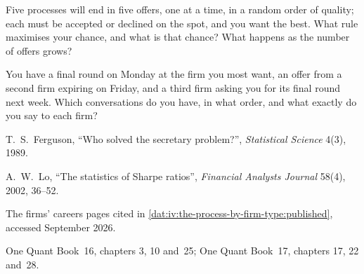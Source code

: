 \begin{interviewq}\label{iq:iv:the-process-by-firm-type:7}
Five processes will end in five offers, one at a time, in a random order of quality; each must be accepted or
declined on the spot, and you want the best. What rule maximises your chance, and what is that chance? What
happens as the number of offers grows?
\end{interviewq}

\begin{interviewq}\label{iq:iv:the-process-by-firm-type:8}
You have a final round on Monday at the firm you most want, an offer from a second firm expiring on Friday,
and a third firm asking you for its final round next week. Which conversations do you have, in what order,
and what exactly do you say to each firm?
\end{interviewq}

\begin{omsources}
\item T.~S.~Ferguson, ``Who solved the secretary problem?'', \emph{Statistical Science} 4(3), 1989.
\item A.~W.~Lo, ``The statistics of Sharpe ratios'', \emph{Financial Analysts Journal} 58(4), 2002, 36--52.
\item The firms' careers pages cited in \cref{dat:iv:the-process-by-firm-type:published}, accessed September
2026.
\item One Quant Book~16, chapters 3, 10 and~25; One Quant Book~17, chapters 17, 22 and~28.
\end{omsources}
